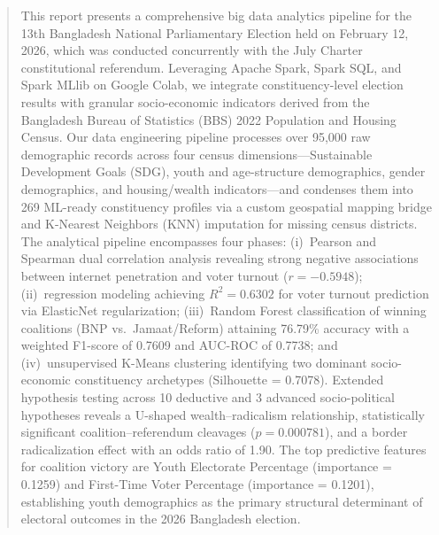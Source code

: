 \documentclass[12pt, a4paper]{article}
\begin{document}
\begin{abstract}
This report presents a comprehensive big data analytics pipeline for the 13th Bangladesh National Parliamentary Election held on February 12, 2026, which was conducted concurrently with the July Charter constitutional referendum. Leveraging Apache Spark, Spark SQL, and Spark MLlib on Google Colab, we integrate constituency-level election results with granular socio-economic indicators derived from the Bangladesh Bureau of Statistics (BBS) 2022 Population and Housing Census. Our data engineering pipeline processes over 95,000 raw demographic records across four census dimensions---Sustainable Development Goals (SDG), youth and age-structure demographics, gender demographics, and housing/wealth indicators---and condenses them into 269 ML-ready constituency profiles via a custom geospatial mapping bridge and K-Nearest Neighbors (KNN) imputation for missing census districts. The analytical pipeline encompasses four phases: (i)~Pearson and Spearman dual correlation analysis revealing strong negative associations between internet penetration and voter turnout ($r = -0.5948$); (ii)~regression modeling achieving $R^2 = 0.6302$ for voter turnout prediction via ElasticNet regularization; (iii)~Random Forest classification of winning coalitions (BNP vs.\ Jamaat/Reform) attaining 76.79\% accuracy with a weighted F1-score of 0.7609 and AUC-ROC of 0.7738; and (iv)~unsupervised K-Means clustering identifying two dominant socio-economic constituency archetypes (Silhouette = 0.7078). Extended hypothesis testing across 10 deductive and 3 advanced socio-political hypotheses reveals a U-shaped wealth--radicalism relationship, statistically significant coalition--referendum cleavages ($p = 0.000781$), and a border radicalization effect with an odds ratio of 1.90. The top predictive features for coalition victory are Youth Electorate Percentage (importance = 0.1259) and First-Time Voter Percentage (importance = 0.1201), establishing youth demographics as the primary structural determinant of electoral outcomes in the 2026 Bangladesh election.
\end{abstract}

\newpage
\tableofcontents
\newpage

\end{document}
